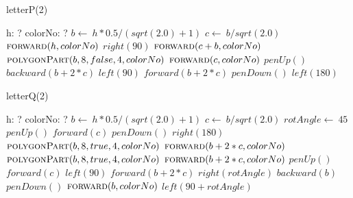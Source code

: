 \documentclass[a4paper,10pt]{article}
\begin{document}
\begin{algorithm}
\caption{letterP(2)}
\begin{algorithmic}[5]
\State {}
\State {}
    \State h: ?
    \State colorNo: ?
  \EndDecl
  \State \(b\gets\ h*0.5/(sqrt(2.0)+1)\)
  \State \(c\gets\ b/sqrt(2.0)\)
  \State \(\Call{forward}{h,colorNo}\)
  \State \(right(90)\)
  \State \(\Call{forward}{c+b,colorNo}\)
  \State {}
  \State {}
  \State \(\Call{polygonPart}{b,8,false,4,colorNo}\)
  \State \(\Call{forward}{c,colorNo}\)
  \State \(penUp()\)
  \State \(backward(b+2*c)\)
  \State \(left(90)\)
  \State \(forward(b+2*c)\)
  \State \(penDown()\)
  \State \(left(180)\)
\EndProcedure
\end{algorithmic}
\end{algorithm}


\begin{algorithm}
\caption{letterQ(2)}
\begin{algorithmic}[5]
\State {}
\State {}
    \State h: ?
    \State colorNo: ?
  \EndDecl
  \State \(b\gets\ h*0.5/(sqrt(2.0)+1)\)
  \State \(c\gets\ b/sqrt(2.0)\)
  \State \(rotAngle\gets\ 45\)
  \State \(penUp()\)
  \State \(forward(c)\)
  \State \(penDown()\)
  \State \(right(180)\)
  \State {}
  \State {}
  \State \(\Call{polygonPart}{b,8,true,4,colorNo}\)
  \State \(\Call{forward}{b+2*c,colorNo}\)
  \State {}
  \State {}
  \State \(\Call{polygonPart}{b,8,true,4,colorNo}\)
  \State \(\Call{forward}{b+2*c,colorNo}\)
  \State \(penUp()\)
  \State \(forward(c)\)
  \State \(left(90)\)
  \State \(forward(b+2*c)\)
  \State \(right(rotAngle)\)
  \State \(backward(b)\)
  \State \(penDown()\)
  \State \(\Call{forward}{b,colorNo}\)
  \State \(left(90+rotAngle)\)
\EndProcedure
\end{algorithmic}
\end{algorithm}
\end{document}
